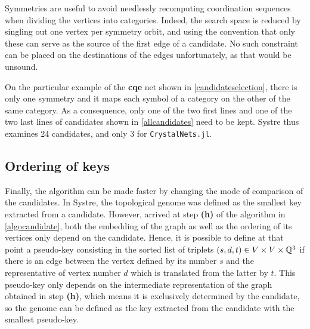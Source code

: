 \documentclass[main.tex]{subfiles}
\begin{document}
Symmetries are useful to avoid needlessly recomputing coordination sequences when dividing the vertices into categories. Indeed, the search space is reduced by singling out one vertex per symmetry orbit, and using the convention that only these can serve as the source of the first edge of a candidate. No such constraint can be placed on the destinations of the edges unfortunately, as that would be unsound.

On the particular example of the \textbf{cqe} net shown in \cref{candidateselection}, there is only one symmetry and it maps each symbol of a category on the other of the same category. As a consequence, only one of the two first lines and one of the two last lines of candidates shown in \cref{allcandidates} need to be kept. Systre thus examines 24 candidates, and only 3 for \texttt{CrystalNets.jl}.



\subsection{Ordering of keys}

Finally, the algorithm can be made faster by changing the mode of comparison of the candidates. In Systre, the topological genome was defined as the smallest key extracted from a candidate. However, arrived at step {\bf (h)} of the algorithm in \cref{algocandidate}, both the embedding of the graph as well as the ordering of its vertices only depend on the candidate. Hence, it is possible to define at that point a pseudo-key consisting in the sorted list of triplets $(s, d, t)\in V\times V\times\mathbb{Q}^3$ if there is an edge between the vertex defined by its number $s$ and the representative of vertex number $d$ which is translated from the latter by $t$. This pseudo-key only depends on the intermediate representation of the graph obtained in step {\bf (h)}, which means it is exclusively determined by the candidate, so the genome can be defined as the key extracted from the candidate with the smallest pseudo-key.
\end{document}
